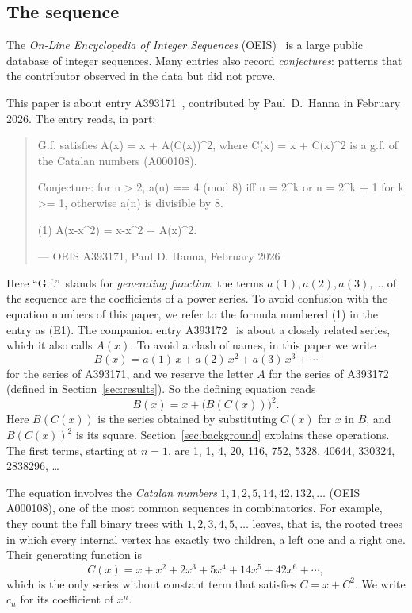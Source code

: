 \documentclass[11pt,a4paper]{article}
\theoremstyle{definition}
\theoremstyle{remark}
\begin{document}
\subsection{The sequence}\label{sec:sequence}
The \emph{On-Line Encyclopedia of Integer Sequences} (OEIS)~\cite{oeisdb} is a large public database of integer
sequences. Many
entries also record \emph{conjectures}: patterns that the contributor observed in the data but did not prove.

This paper is about entry A393171~\cite{oeis}, contributed by Paul~D.~Hanna in February 2026. The entry reads, in part:
\begin{quote}\small\ttfamily\raggedright G.f. satisfies A(x) = x + A(C(x))\^{}2, where C(x) = x + C(x)\^{}2 is a g.f. of the Catalan numbers (A000108).\par\smallskip Conjecture: for n > 2, a(n) == 4 (mod 8) iff n = 2\^{}k or n = 2\^{}k + 1 for k >= 1, otherwise a(n) is divisible by 8.\par\smallskip (1) A(x-x\^{}2) = x-x\^{}2 + A(x)\^{}2.\par\smallskip\hfill\textrm{--- OEIS A393171, Paul D. Hanna, February 2026}\end{quote}

Here ``G.f.''\ stands for \emph{generating function}: the terms $a(1),a(2),a(3),\dots$ of the sequence are the
coefficients of a power series. To avoid confusion with the equation numbers of this paper, we refer to the formula
numbered (1) in the entry as (E1). The companion entry A393172~\cite{oeis172} is about a closely related series, which it
also calls $A(x)$. To avoid a clash of names, in this paper we write
\[
B(x)=a(1)\,x+a(2)\,x^2+a(3)\,x^3+\cdots
\]
for the series of A393171, and we reserve the letter $A$ for the series of A393172 (defined in
Section~\ref{sec:results}). So the defining equation reads
\[
B(x)=x+\bigl(B(C(x))\bigr)^2 .
\]
Here $B(C(x))$ is the series obtained by substituting $C(x)$ for $x$ in $B$, and $B(C(x))^2$ is its square. Section~\ref{sec:background} explains these operations. The first terms, starting at $n=1$, are
1, 1, 4, 20, 116, 752, 5328, 40644, 330324, 2838296, \dots

The equation involves the \emph{Catalan numbers} $1,1,2,5,14,42,132,\dots$ (OEIS A000108), one of the most common
sequences in combinatorics. For example, they count the full binary trees with $1,2,3,4,5,\dots$ leaves, that is,
the rooted trees in which every internal vertex has exactly two children, a left one and a right one. Their generating
function is
\[
C(x)=x+x^2+2x^3+5x^4+14x^5+42x^6+\cdots,
\]
which is the only series without constant term that satisfies $C=x+C^2$. We write $c_n$ for its coefficient of $x^n$.
\end{document}
